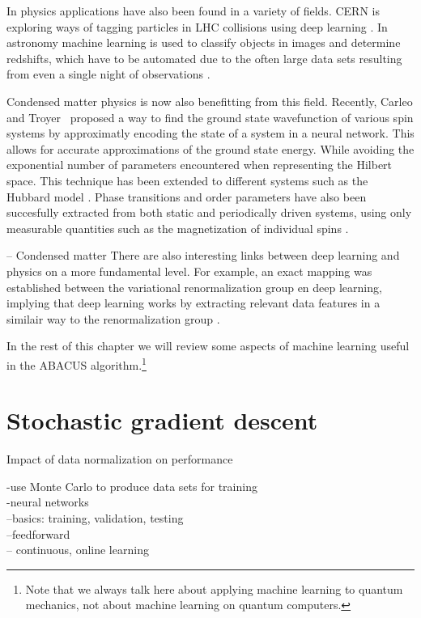 \documentclass[11pt, a4paper,draft]{report} %
\begin{document}
In physics applications have also been found in a variety of fields.
CERN is exploring ways of tagging particles in LHC collisions using deep learning \cite{paganini17_machin_learn_algor_jet_taggin}.
In astronomy machine learning is used to classify objects in images and determine redshifts, which have to be automated due to the often large data sets resulting from even a single night of observations \cite{ball10_data_minin_and_machin_learn_in_astron}.

Condensed matter physics is now also benefitting from this field.
Recently, Carleo and Troyer~\cite{Carleo2017} proposed a way to find the ground state wavefunction of various spin systems by approximatly encoding the state of a system in a neural network. This allows for accurate approximations of the ground state energy. While avoiding the exponential number of parameters encountered when representing the Hilbert space.
This technique has been extended to different systems such as the Hubbard model \cite{Saito2017}.
Phase transitions and order parameters have also been succesfully extracted from both static and periodically driven systems, using only measurable quantities such as the magnetization of individual spins \cite{Nieuwenburg2017}.

-- Condensed matter\cite{dunjko17_machin_learn_artif_intel_quant_domain}
There are also interesting links between deep learning and physics on a more fundamental level.
For example, an exact mapping was established between the variational renormalization group en deep learning, implying that deep learning works by extracting relevant data features in a similair way to the renormalization group \cite{Mehta2014}. 

In the rest of this chapter we will review some aspects of machine learning useful in the ABACUS algorithm.\footnote{Note that we always talk here about applying machine learning to quantum mechanics, not about machine learning on quantum computers.}

\section{Stochastic gradient descent}
Impact of data normalization on performance



-use Monte Carlo to produce data sets for training\\
-neural networks\\
--basics: training, validation, testing\\
--feedforward\\
-- continuous, online learning
\end{document}
